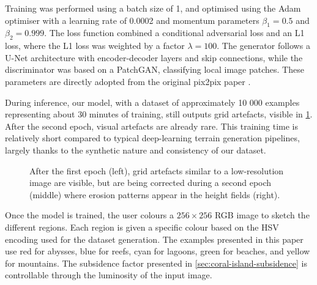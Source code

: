 Training was performed using a batch size of 1, and optimised using the Adam optimiser with a learning rate of 0.0002 and momentum parameters $\beta_1 = 0.5$ and $\beta_2 = 0.999$. The loss function combined a conditional adversarial loss and an L1 loss, where the L1 loss was weighted by a factor $\lambda = 100$. The generator follows a U-Net architecture with encoder-decoder layers and skip connections, while the discriminator was based on a PatchGAN, classifying local image patches. These parameters are directly adopted from the original pix2pix paper \cite{Isola2017}.

During inference, our model, with a dataset of approximately 10 000 examples representing about 30 minutes of training, still outputs grid artefacts, visible in \cref{fig:coral-island-first-epoch}. After the second epoch, visual artefacts are already rare. This training time is relatively short compared to typical deep-learning terrain generation pipelines, largely thanks to the synthetic nature and consistency of our dataset.

\begin{figure}[t]
    \caption[Outputs of the cGAN after training on 10 000, 15 000 and 20 000 samples]{After the first epoch (left), grid artefacts similar to a low-resolution image are visible, but are being corrected during a second epoch (middle) where erosion patterns appear in the height fields (right).}
    \label{fig:coral-island-first-epoch}
\end{figure}

Once the model is trained, the user colours a $256\times256$ RGB image to sketch the different regions. Each region is given a specific colour based on the HSV encoding used for the dataset generation. The examples presented in this paper use red for abysses, blue for reefs, cyan for lagoons, green for beaches, and yellow for mountains. The subsidence factor presented in \cref{sec:coral-island-subsidence} is controllable through the luminosity of the input image.

